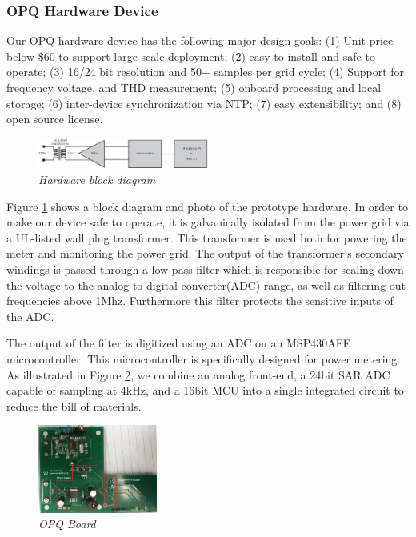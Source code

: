 \subsubsection{OPQ Hardware Device}

Our OPQ hardware device has the following major design goals: (1) Unit price below \$60 to support large-scale deployment; (2) easy to install and safe to operate; (3) 16/24 bit resolution and 50+ samples per grid cycle; (4) Support for frequency voltage, and THD measurement; (5) onboard processing and local storage; (6) inter-device synchronization via NTP; (7) easy extensibility; and (8) open source license. 

\begin{figure}
  \includegraphics[width=0.5\textwidth]{figures/hardware-block-diagram.eps}
  \caption{\em \small Hardware block diagram}
  \label{fig:hardware-block-diagram}
\end{figure} 

Figure \ref{fig:hardware-block-diagram} shows a block diagram and photo of the prototype hardware. In order to make our device safe to operate, it is galvanically isolated from the power grid via a UL-listed wall plug transformer. This transformer is used both for powering the meter and monitoring the power grid. The output of the transformer's secondary windings is passed through a low-pass filter which is responsible for scaling down the voltage to the analog-to-digital converter(ADC) range, as well as filtering out frequencies above 1Mhz. Furthermore this filter protects the sensitive inputs of the ADC.

The output of the filter is digitized using an ADC on an MSP430AFE microcontroller. This microcontroller is specifically designed for power metering. As illustrated in Figure \ref{fig:board}, we combine an analog front-end, a 24bit SAR ADC capable of sampling at 4kHz, and a 16bit MCU into a single integrated circuit to reduce the bill of materials. 

\begin{figure}
  \includegraphics[width=0.35\textwidth]{figures/board3.eps}
  \caption{\em \small OPQ Board}
  \label{fig:board}
\end{figure} 

